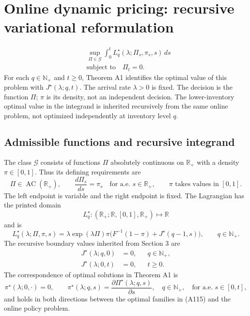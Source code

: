 \documentclass{article}
\begin{document}
\section*{Online dynamic pricing: recursive variational reformulation}
\begin{equation}
\begin{aligned}
&\sup_{\Pi\in\mathcal G}\int_0^t L_q^\star(\lambda;\Pi_s,\pi_s,s)\,ds\\
&\text{subject to}\quad \Pi_t=0.
\end{aligned}\tag{A115}
\end{equation}
For each $q\in\mathbb N_+$ and $t\geq0$, Theorem A1 identifies the optimal value of this problem with $J^\star(\lambda;q,t)$. The arrival rate $\lambda>0$ is fixed. The decision is the function $\Pi$; $\pi$ is its density, not an independent decision. The lower-inventory optimal value in the integrand is inherited recursively from the same online problem, not optimized independently at inventory level $q$.

\subsection*{Admissible functions and recursive integrand}
The class $\mathcal G$ consists of functions $\Pi$ absolutely continuous on $\mathbb R_+$ with a density $\pi\in[0,1]$. Thus its defining requirements are
\[
\Pi\in\operatorname{AC}(\mathbb R_+),\qquad
\frac{d\Pi_s}{ds}=\pi_s\quad\text{for a.e. }s\in\mathbb R_+,
\qquad \pi\text{ takes values in }[0,1].
\]
The left endpoint is variable and the right endpoint is fixed. The Lagrangian has the printed domain
\[
L_q^\star:(\mathbb R_+;\mathbb R,[0,1],\mathbb R_+)\longmapsto\mathbb R
\]
and is
\begin{equation}
L_q^\star(\lambda;\Pi,\pi,s)
=\lambda\exp(\lambda\Pi)\pi\bigl(F^{-1}(1-\pi)+J^\star(q-1,s)\bigr),
\qquad q\in\mathbb N_+.
\tag{A116}
\end{equation}
The recursive boundary values inherited from Section 3 are
\begin{equation}
\begin{aligned}
J^\star(\lambda;q,0)&=0,&&q\in\mathbb N_+,\\
J^\star(\lambda;0,t)&=0,&&t\geq0.
\end{aligned}\tag{4, boundary values}
\end{equation}
The correspondence of optimal solutions in Theorem A1 is
\[
\pi^\star(\lambda;0,\cdot)=0,\qquad
\pi^\star(\lambda;q,s)
=\frac{\partial\Pi^\star(\lambda;q,s)}{\partial s},
\quad q\in\mathbb N_+,\quad\text{for a.e. }s\in[0,t],
\]
and holds in both directions between the optimal families in (A115) and the online policy problem.
\end{document}
